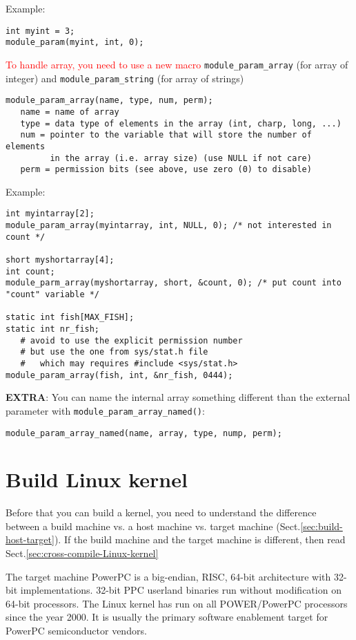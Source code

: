 Example:
\begin{verbatim}
int myint = 3;
module_param(myint, int, 0);
\end{verbatim}

\textcolor{red}{To handle array, you need to use a new macro}
\verb!module_param_array! (for array of integer) and \verb!module_param_string! (for array of strings)
\begin{verbatim}
module_param_array(name, type, num, perm);
   name = name of array
   type = data type of elements in the array (int, charp, long, ...)
   num = pointer to the variable that will store the number of elements 
         in the array (i.e. array size) (use NULL if not care)
   perm = permission bits (see above, use zero (0) to disable)
\end{verbatim}

Example:
\begin{verbatim}
int myintarray[2];
module_param_array(myintarray, int, NULL, 0); /* not interested in count */

short myshortarray[4];
int count;
module_parm_array(myshortarray, short, &count, 0); /* put count into "count" variable */

static int fish[MAX_FISH];
static int nr_fish;
   # avoid to use the explicit permission number
   # but use the one from sys/stat.h file
   #   which may requires #include <sys/stat.h>
module_param_array(fish, int, &nr_fish, 0444);
\end{verbatim}

{\bf EXTRA}: 
You can name the internal array something different than the external parameter with 
\verb!module_param_array_named()!:

\begin{verbatim}
module_param_array_named(name, array, type, nump, perm);
\end{verbatim}


\section{Build Linux kernel}
\label{sec:build_Linux-kernel}

Before that you can build a kernel, you need to understand the difference
between a build machine vs. a host machine vs. target machine
(Sect.\ref{sec:build-host-target}). If the build machine and the target machine
is different, then read Sect.\ref{sec:cross-compile-Linux-kernel}

The target machine PowerPC is a big-endian, RISC, 64-bit architecture with
32-bit implementations. 32-bit PPC userland binaries run without modification on
64-bit processors. The Linux kernel has run on all POWER/PowerPC processors
since the year 2000. It is usually the primary software enablement target for
PowerPC semiconductor vendors.

